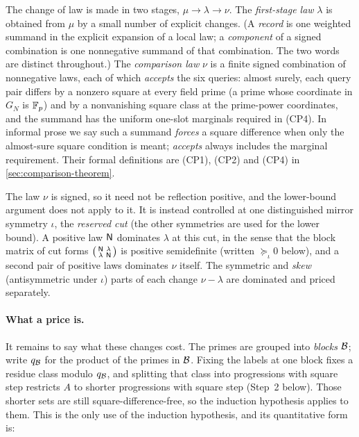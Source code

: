 The change of law is made in two stages, $\mu\to\lambda\to\nu$.
The \emph{first-stage law} $\lambda$ is obtained from $\mu$ by a
small number of explicit changes. (A \emph{record} is one weighted
summand in the explicit expansion of a local law; a
\emph{component} of a signed combination is one nonnegative summand
of that combination. The two words are distinct throughout.) The
\emph{comparison law} $\nu$ is a finite signed combination of
nonnegative laws, each of which \emph{accepts} the six queries:
almost surely, each query pair differs by a nonzero square at every
field prime (a prime whose coordinate in $G_N$ is $\mathbb F_p$) and by a
nonvanishing square class at the prime-power coordinates, and the
summand has the uniform one-slot marginals required in (CP4).
In informal prose we say such a summand \emph{forces} a square
difference when only the almost-sure square condition is meant;
\emph{accepts} always includes the marginal requirement. Their
formal definitions are (CP1), (CP2) and (CP4) in
\cref{sec:comparison-theorem}.

The law $\nu$ is signed, so it need not be reflection positive,
and the lower-bound argument does not apply to it. It is instead
controlled at one distinguished mirror symmetry $\iota$, the
\emph{reserved cut} (the other symmetries are used for the lower
bound). A positive law $\mathsf N$ dominates $\lambda$ at this cut, in
the sense that the block matrix of cut forms
$\bigl(\begin{smallmatrix}\mathsf N&\lambda\\
\lambda&\mathsf N\end{smallmatrix}\bigr)$ is positive semidefinite
(written $\succeq_\iota0$ below), and a second pair of positive
laws dominates $\nu$ itself. The symmetric and \emph{skew}
(antisymmetric under $\iota$) parts of each change
$\nu-\lambda$ are dominated and priced separately.

\paragraph{What a price is.}
It remains to say what these changes cost. The primes are grouped
into \emph{blocks} $\mathcal B$; write $q_{\mathcal B}$ for the product of the
primes in $\mathcal B$. Fixing the labels at one block fixes a residue
class modulo $q_{\mathcal B}$, and splitting that class into progressions
with square step restricts $A$ to shorter progressions with square
step (Step~2 below). Those shorter sets
are still square-difference-free, so the induction hypothesis
applies to them. This is the only use of the induction hypothesis,
and its quantitative form is:


